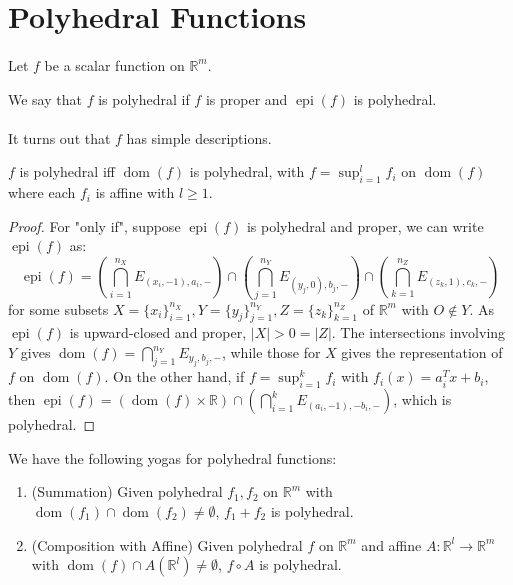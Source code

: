 \section{Polyhedral Functions}

\paragraph{}Let $f$ be a scalar function on $\mathbb{R}^m$.

\begin{defn}\label{defn:026-polyhedral-functions}
	We say that $f$ is polyhedral if $f$ is proper and $\operatorname{epi}(f)$ is polyhedral.
\end{defn}

\paragraph{}It turns out that $f$ has simple descriptions.

\begin{prop}\label{prop:026-polyhedral-function-representation}
	$f$ is polyhedral iff $\operatorname{dom}(f)$ is polyhedral, with $f=\sup_{i=1}^l f_i$ on $\operatorname{dom}(f)$ where each $f_i$ is affine with $l\geq 1$.
\end{prop}
\begin{proof}
	For "only if", suppose $\operatorname{epi}(f)$ is polyhedral and proper, we can write $\operatorname{epi}(f)$ as:
	\[
		\operatorname{epi}(f)=\left(\bigcap_{i=1}^{n_X}E_{(x_i,-1),a_i,-} \right)\cap\left(\bigcap_{j=1}^{n_Y}E_{(y_j,0),b_j,-} \right)\cap\left(\bigcap_{k=1}^{n_Z}E_{(z_k,1),c_k,-} \right)
	\]
	for some subsets $X=\{x_i\}_{i=1}^{n_X},Y=\{y_j\}_{j=1}^{n_Y},Z=\{z_k\}_{k=1}^{n_Z}$ of $\mathbb{R}^m$ with $O\notin Y$. As $\operatorname{epi}(f)$ is upward-closed and proper, $|X|>0=|Z|$. The intersections involving $Y$ gives $\operatorname{dom}(f)=\bigcap_{j=1}^{n_Y}E_{y_j,b_j,-}$, while those for $X$ gives the representation of $f$ on $\operatorname{dom}(f)$. On the other hand, if $f=\sup_{i=1}^kf_i$ with $f_i(x)=a_i^Tx+b_i$, then $\operatorname{epi}(f)=\left(\operatorname{dom}(f)\times \mathbb{R}\right)\cap\left(\bigcap_{i=1}^kE_{(a_i,-1),-b_i,-}\right)$, which is polyhedral.
\end{proof}

\begin{prop}\label{prop:026-yoga-polyhedral}
	We have the following yogas for polyhedral functions:
	\begin{enumerate}[label=(\alph*)]
		\item (Summation) Given polyhedral $f_1,f_2$ on $\mathbb{R}^m$ with $\operatorname{dom}(f_1)\cap\operatorname{dom}(f_2)\neq\emptyset$, $f_1+f_2$ is polyhedral.
		\item (Composition with Affine) Given polyhedral $f$ on $\mathbb{R}^m$ and affine $A:\mathbb{R}^l\to \mathbb{R}^m$ with $\operatorname{dom}(f)\cap A(\mathbb{R}^l)\neq\emptyset$, $f\circ A$ is polyhedral.
	\end{enumerate}
\end{prop}

